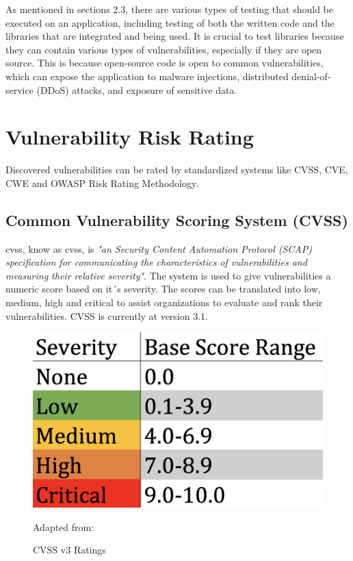 As mentioned in sections 2.3, there are various types of testing that should be executed on an application, including testing of both the written code and the libraries that are integrated and being used. It is crucial to test libraries because they can contain various types of vulnerabilities, especially if they are open source. This is because open-source code is open to common vulnerabilities, which can expose the application to malware injections, distributed denial-of-service (DDoS) attacks, and exposure of sensitive data. \cite{testlibaries}

\newpage

\section{Vulnerability Risk Rating}
Discovered vulnerabilities can be rated by standardized systems like CVSS, CVE, CWE and OWASP Risk Rating Methodology. 



\subsection{Common Vulnerability Scoring System (CVSS)}
\acrlong{cvss}, know as \acrshort{cvss}, is \textit{"an Security Content Automation Protocol (SCAP) specification for communicating the characteristics of vulnerabilities and measuring their relative severity"}\cite{nistCVSS}. The system is used to give vulnerabilities a numeric score based on it´s severity. The scores can be translated into low, medium, high and critical to assist organizations to evaluate and rank their vulnerabilities. CVSS is currently at version 3.1. \cite{CVSS}
\begin{figure}[htp]
    \centering
    \includegraphics[scale=0.3]{Images/CVSS.png}
    \caption{CVSS v3 Ratings} Adapted from:\cite{cvssrating}
    \label{fig:my_label}
\end{figure}


